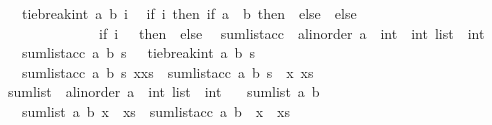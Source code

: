 \begin{isabellebody}
\ \ \ {\isachardoublequoteopen}tie{\isacharunderscore}{\kern0pt}break{\isacharunderscore}{\kern0pt}int\ a\ b\ i\ {\isacharequal}{\kern0pt}\isanewline
\ {\isacharparenleft}{\kern0pt}if\ i{\isacharequal}{\kern0pt}{}\ then\ {\isacharparenleft}{\kern0pt}if\ {\isacharparenleft}{\kern0pt}a\ {\isasymle}\ b{\isacharparenright}{\kern0pt}\ then\ {}\ else\ {\isacharminus}{\kern0pt}{}{\isacharparenright}{\kern0pt}\ else\ \isanewline
\ \ \ \ \ \ \ \ \ \ \ \ \ \ {\isacharparenleft}{\kern0pt}if\ i\ {\isachargreater}{\kern0pt}\ {}\ then\ {}\ else\ {\isacharminus}{\kern0pt}{}{\isacharparenright}{\kern0pt}{\isacharparenright}{\kern0pt}{\isachardoublequoteclose}\isanewline
\isanewline
{}\isamarkupfalse%
\ sumlist{\isacharunderscore}{\kern0pt}acc\ {\isacharcolon}{\kern0pt}{\isacharcolon}{\kern0pt}\ {\isachardoublequoteopen}{\isacharprime}{\kern0pt}a{\isacharcolon}{\kern0pt}{\isacharcolon}{\kern0pt}linorder\ {\isasymRightarrow}{\isacharprime}{\kern0pt}a\ {\isasymRightarrow}\ int\ {\isasymRightarrow}\ int\ list\ {\isasymRightarrow}\ int{\isachardoublequoteclose}\isanewline
\ \ \ {\isachardoublequoteopen}sumlist{\isacharunderscore}{\kern0pt}acc\ a\ b\ s\ {\isacharbrackleft}{\kern0pt}{\isacharbrackright}{\kern0pt}\ {\isacharequal}{\kern0pt}\ tie{\isacharunderscore}{\kern0pt}break{\isacharunderscore}{\kern0pt}int\ a\ b\ s{\isachardoublequoteclose}\isanewline
\ \ {\isacharbar}{\kern0pt}\ {\isachardoublequoteopen}sumlist{\isacharunderscore}{\kern0pt}acc\ a\ b\ s\ {\isacharparenleft}{\kern0pt}x{\isacharhash}{\kern0pt}xs{\isacharparenright}{\kern0pt}\ {\isacharequal}{\kern0pt}\ sumlist{\isacharunderscore}{\kern0pt}acc\ a\ b\ {\isacharparenleft}{\kern0pt}s\ {\isacharplus}{\kern0pt}\ x{\isacharparenright}{\kern0pt}\ xs{\isachardoublequoteclose}\isanewline
\isanewline
{}\isamarkupfalse%
\ sumlist\ {\isacharcolon}{\kern0pt}{\isacharcolon}{\kern0pt}\ {\isachardoublequoteopen}{\isacharprime}{\kern0pt}a{\isacharcolon}{\kern0pt}{\isacharcolon}{\kern0pt}linorder\ {\isasymRightarrow}{\isacharprime}{\kern0pt}a\ {\isasymRightarrow}\ int\ list\ {\isasymRightarrow}\ int{\isachardoublequoteclose}\isanewline
\ \ \ {\isachardoublequoteopen}sumlist\ a\ b\ {\isacharbrackleft}{\kern0pt}{\isacharbrackright}{\kern0pt}\ {\isacharequal}{\kern0pt}\ {}{\isachardoublequoteclose}\isanewline
\ \ {\isacharbar}{\kern0pt}\ {\isachardoublequoteopen}sumlist\ a\ b\ {\isacharparenleft}{\kern0pt}x\ {\isacharhash}{\kern0pt}\ xs{\isacharparenright}{\kern0pt}\ {\isacharequal}{\kern0pt}\ sumlist{\isacharunderscore}{\kern0pt}acc\ a\ b\ {}\ {\isacharparenleft}{\kern0pt}x\ {\isacharhash}{\kern0pt}\ xs{\isacharparenright}{\kern0pt}{\isachardoublequoteclose}\isanewline

\end{isabellebody}
